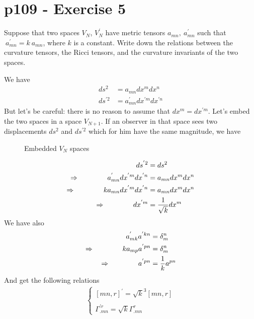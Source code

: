 \section{p109 - Exercise 5}
\begin{tcolorbox}
Suppose that two spaces $V_N$, $V^{'}_N$ have metric tensors $a_{mn}, \ a^{'}_{mn}$ such that $\ a^{'}_{mn}=k\ a_{mn}  $, where $k$ is a constant. Write down the relations between the curvature tensors, the Ricci tensors, and the curvature invariants of the two spaces.
\end{tcolorbox}
We have 
\begin{align*}
 ds^2 &= a_{mn}dx^{m} dx^{n}\\
 ds^{'2}&= a^{'}_{mn} dx^{'m}dx^{'n}
\end{align*}
But let's be careful: there is no reason to assume that  $dx^m = dx^{'m}$. Let's embed the two spaces in a space $V_{N+1}$. If an observer in that space sees two displacements  $ds^2$ and $ds^{'2}$ which for him have the same magnitude, we have
\begin{figure}[H]
\centering
\begin{minipage}[t]{.4\textwidth}
\vspace{0pt}

\end{minipage}\hfill
\caption{Embedded $V_N$ spaces}
\label{fig:p109_Ex5_a}
\end{figure}
\begin{align*}
 ds^{'2} &= ds^2\\
 \Rightarrow \quad\quad\quad\quad a^{'}_{mn} dx^{'m}dx^{'n} &= a_{mn}dx^{m} dx^{n}\\
 \Rightarrow \quad\quad\quad\quad k a_{mn} dx^{'m}dx^{'n} &= a_{mn}dx^{m} dx^{n}\\
 \Rightarrow \quad\quad\quad\quad dx^{'m} &= \frac{1}{\sqrt{k}}dx^{m}
\end{align*}
We have also
\begin{align*}
 a^{'}_{mk}a^{'kn} &= \delta^n_m\\
 \Rightarrow \quad\quad\quad\quad ka_{mp}a^{'pn} &= \delta^n_m\\
 \Rightarrow \quad\quad\quad\quad a^{'pn} &= \frac{1}{k}a^{pn}
\end{align*}
And get the following relations
\begin{align*}
\left \{ \begin{array}{l}
 [mn,r]^{'} = \sqrt{k}^3[mn,r]\\\\
 \Gamma^{'r}_{.mn} =\sqrt{k}\Gamma^{r}_{.mn}
 \end {array}\right.
 \end{align*}
